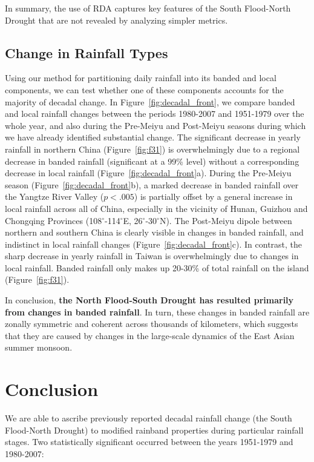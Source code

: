 \documentclass{ametsoc}
\begin{document}
	In summary, the use of RDA captures key features of the South Flood-North Drought that are not revealed by analyzing simpler metrics.


\subsection{Change in Rainfall Types}

	Using our method for partitioning daily rainfall into its banded and local components, we can test whether one of these components accounts for the majority of decadal change. In Figure~\ref{fig:decadal_front}, we compare banded and local rainfall changes between the periods 1980-2007 and 1951-1979 over the whole year, and also during the Pre-Meiyu and Post-Meiyu seasons during which we have already identified substantial change. The significant decrease in yearly rainfall in northern China (Figure~\ref{fig:f31}) is overwhelmingly due to a regional decrease in banded rainfall (significant at a 99\% level) without a corresponding decrease in local rainfall (Figure~\ref{fig:decadal_front}a). During the Pre-Meiyu season (Figure~\ref{fig:decadal_front}b), a marked decrease in banded rainfall over the Yangtze River Valley ($p<.005$) is partially offset by a general increase in local rainfall across all of China, especially in the vicinity of Hunan, Guizhou and Chongqing Provinces (108$^\circ$-114$^\circ$E, 26$^\circ$-30$^\circ$N). The Post-Meiyu dipole between northern and southern China is clearly visible in changes in banded rainfall, and indistinct in local rainfall changes (Figure~\ref{fig:decadal_front}c). In contrast, the sharp decrease in yearly rainfall in Taiwan is overwhelmingly due to changes in local rainfall. Banded rainfall only makes up 20-30\% of total rainfall on the island (Figure~\ref{fig:f31}).

	In conclusion, \textbf{the North Flood-South Drought has resulted primarily from changes in banded rainfall}. In turn, these changes in banded rainfall are zonally symmetric and coherent across thousands of kilometers, which suggests that they are caused by changes in the large-scale dynamics of the East Asian summer monsoon.

\section{Conclusion}
	
	We are able to ascribe previously reported decadal rainfall change (the South Flood-North Drought) to modified rainband properties during particular rainfall stages. Two statistically significant occurred between the years 1951-1979 and 1980-2007: 
\end{document}
